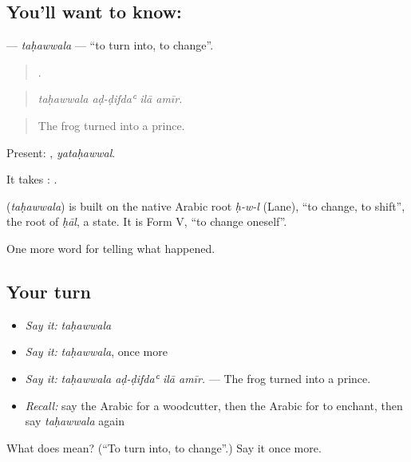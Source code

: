 \subsection*{You'll want to know: }
\textbf{} — \emph{taḥawwala} — \textquotedblleft{}to turn into, to change\textquotedblright{}.

\begin{quote}
   .
\end{quote}

\begin{quote}
\emph{taḥawwala aḍ-ḍifdaʿ ilā amīr.}
\end{quote}

\begin{quote}
The frog turned into a prince.
\end{quote}

Present: , \emph{yataḥawwal}.

It takes :  .

\begin{cousinweb}
\textbf{} (\emph{taḥawwala}) is built on the native Arabic root \emph{ḥ-w-l} (Lane), \textquotedblleft{}to change, to shift\textquotedblright{}, the root of \emph{ḥāl}, a state. It is Form V, \textquotedblleft{}to change oneself\textquotedblright{}.
\end{cousinweb}

\begin{grammarlens}[title={What you've built}]
One more word for telling what happened.
\end{grammarlens}

\subsection*{Your turn}
\begin{itemize}
\raggedright
  \item \emph{Say it:} \emph{taḥawwala}
  \item \emph{Say it:} \emph{taḥawwala}, once more
  \item \emph{Say it:} \emph{taḥawwala aḍ-ḍifdaʿ ilā amīr.} — The frog turned into a prince.
  \item \emph{Recall:} say the Arabic for a woodcutter, then the Arabic for to enchant, then say \emph{taḥawwala} again
\end{itemize}

\begin{tcolorbox}[breakable,colback=teal!4,colframe=teal!35!black,title={Before you move on}]
What does  mean? (\textquotedblleft{}To turn into, to change\textquotedblright{}.) Say it once more.
\end{tcolorbox}

